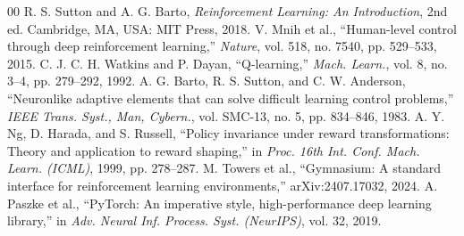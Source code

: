\documentclass[conference]{IEEEtran}
\begin{document}
\begin{thebibliography}{00}
 R. S. Sutton and A. G. Barto, \emph{Reinforcement Learning: An Introduction}, 2nd ed. Cambridge, MA, USA: MIT Press, 2018.
 V. Mnih et al., ``Human-level control through deep reinforcement learning,'' \emph{Nature}, vol. 518, no. 7540, pp. 529--533, 2015.
 C. J. C. H. Watkins and P. Dayan, ``Q-learning,'' \emph{Mach. Learn.}, vol. 8, no. 3--4, pp. 279--292, 1992.
 A. G. Barto, R. S. Sutton, and C. W. Anderson, ``Neuronlike adaptive elements that can solve difficult learning control problems,'' \emph{IEEE Trans. Syst., Man, Cybern.}, vol. SMC-13, no. 5, pp. 834--846, 1983.
 A. Y. Ng, D. Harada, and S. Russell, ``Policy invariance under reward transformations: Theory and application to reward shaping,'' in \emph{Proc. 16th Int. Conf. Mach. Learn. (ICML)}, 1999, pp. 278--287.
 M. Towers et al., ``Gymnasium: A standard interface for reinforcement learning environments,'' arXiv:2407.17032, 2024.
 A. Paszke et al., ``PyTorch: An imperative style, high-performance deep learning library,'' in \emph{Adv. Neural Inf. Process. Syst. (NeurIPS)}, vol. 32, 2019.
\end{thebibliography}
\end{document}
